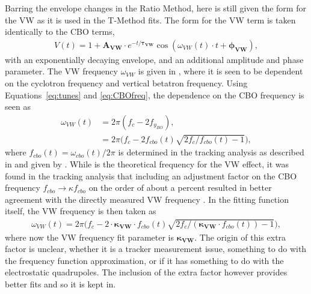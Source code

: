 Barring the envelope changes in the Ratio Method, here is still given the form for the VW as it is used in the T-Method fits. The form for the VW term is taken identically to the CBO terms, 
    \begin{align} \label{eq:VWterm}
        V(t) = 1 + \boldsymbol{A_{VW}} \cdot e^{-t/\boldsymbol{\tau_{VW}}} \cos(\omega_{VW}(t) \cdot t + \boldsymbol{\phi_{VW}}), 
    \end{align}
with an exponentially decaying envelope, and an additional amplitude and phase parameter. The VW frequency $\omega_{VW}$ is given in , where it is seen to be dependent on the cyclotron frequency and vertical betatron frequency. Using Equations~\ref{eq:tunes} and \ref{eq:CBOfreq}, the dependence on the CBO frequency is seen as
    \begin{equation}
    \begin{aligned}
        \omega_{VW}(t) &= 2\pi (f_{c} - 2f_{y_{BO}}), \\
                    &= 2\pi \Big(f_{c} - 2f_{cbo}(t)\sqrt{2f_{c}/f_{cbo}(t)-1}\Big),
    \label{eq:VWfreqOne}
    \end{aligned}
    \end{equation}
where $f_{cbo}(t) = \omega_{cbo}(t)/2\pi$ is determined in the tracking analysis as described in  and given by . While  is the theoretical frequency for the VW effect, it was found in the tracking analysis that including an adjustment factor on the CBO frequency $f_{cbo} \rightarrow \kappa f_{cbo}$ on the order of about a percent resulted in better agreement with the directly measured VW frequency \cite{cbofrequency,verticalbetatron}. In the fitting function itself, the VW frequency is then taken as
    \begin{align} \label{eq:VWfreqKappa}
        \omega_{VW}(t) = 2\pi \Big(f_{c} - 2 \cdot \boldsymbol{\kappa_{VW}} \cdot f_{cbo}(t)\sqrt{2f_{c}/(\boldsymbol{\kappa_{VW}} \cdot f_{cbo}(t))-1}\Big),
    \end{align}
where now the VW frequency fit parameter is $\boldsymbol{\kappa_{VW}}$. The origin of this extra factor is unclear, whether it is a tracker measurement issue, something to do with the frequency function approximation, or if it has something to do with the electrostatic quadrupoles. The inclusion of the extra factor however provides better fits and so it is kept in.




